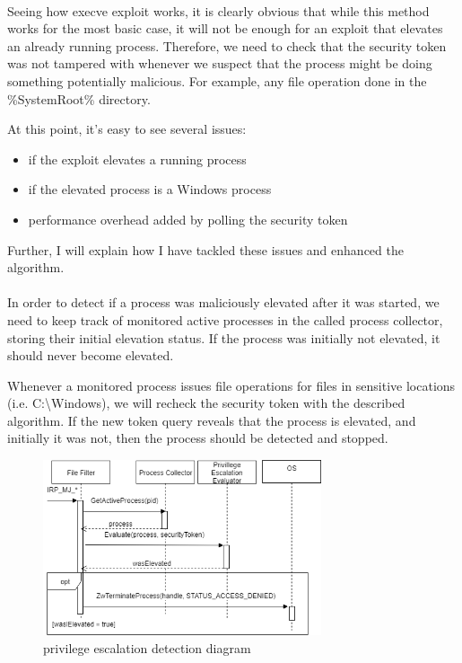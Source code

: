         \paragraph{}
        Seeing how execve exploit works, it is clearly obvious that while this method works for the most basic case, it will not be enough for an
        exploit that elevates an already running process. Therefore, we need to check that the security token was not tampered with whenever we
        suspect that the process might be doing something potentially malicious. For example, any file operation done in the \%SystemRoot\%
        directory.

        At this point, it's easy to see several issues:

        \begin{itemize}
            \item if the exploit elevates a running process
            \item if the elevated process is a Windows process
            \item performance overhead added by polling the security token
        \end{itemize}

        Further, I will explain how I have tackled these issues and enhanced the algorithm.

        \paragraph{}
        In order to detect if a process was maliciously elevated after it was started, we need to keep track of monitored active processes in the
        called process collector, storing their initial elevation status. If the process was initially not elevated, it should never become
        elevated.

        Whenever a monitored process issues file operations for files in sensitive locations (i.e. C:\textbackslash Windows), we will recheck
        the security token with the described algorithm. If the new token query reveals that the process is elevated, and initially it was not,
        then the process should be detected and stopped.

        \pagebreak

        \begin{figure}[!ht]
            \centering
            \includegraphics[width=310px,keepaspectratio]{img/privilege_escalation_detection_diagram.png}
            \caption{privilege escalation detection diagram}
            \label{fig:privilege_escalation_detection_diagram}
        \end{figure}

